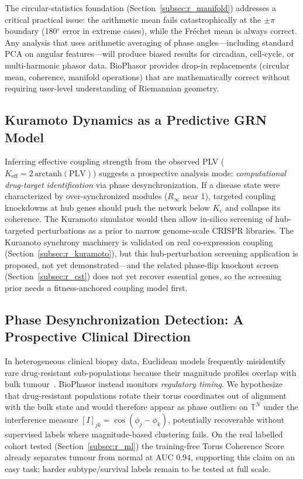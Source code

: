 \documentclass[preprint,12pt,amsmath,amssymb,superscriptaddress,floatfix]{revtex4-2}
\newcommand{\torus}{\mathbb{T}}
\begin{document}
The circular-statistics foundation (Section~\ref{subsec:r_manifold})
addresses a critical practical issue: the arithmetic mean fails
catastrophically at the $\pm\pi$ boundary (180$^\circ$ error in extreme
cases), while the Fr\'{e}chet mean is always correct.
Any analysis that uses arithmetic averaging of phase angles---including
standard PCA on angular features---will produce biased results for
circadian, cell-cycle, or multi-harmonic phasor data.
BioPhasor provides drop-in replacements (circular mean, coherence,
manifold operations) that are
mathematically correct without requiring user-level understanding
of Riemannian geometry.

\subsection{Kuramoto Dynamics as a Predictive GRN Model}

Inferring effective coupling strength from the observed PLV
($K_{\mathrm{eff}} = 2\,\mathrm{arctanh}(\mathrm{PLV})$) suggests a
prospective analysis mode: \emph{computational drug-target identification}
via phase desynchronization. If a disease state were characterized by
over-synchronized modules ($R_\infty$ near 1), targeted coupling knockdowns
at hub genes should push the network below $K_c$ and collapse its coherence.
The Kuramoto simulator would then allow in-silico screening of hub-targeted
perturbations as a prior to narrow genome-scale CRISPR libraries. The Kuramoto
synchrony machinery is validated on real co-expression coupling
(Section~\ref{subsec:r_kuramoto}), but this hub-perturbation screening
application is proposed, not yet demonstrated---and the related phase-flip
knockout screen (Section~\ref{subsec:r_cst}) does not yet recover essential
genes, so the screening prior needs a fitness-anchored coupling model first.

\subsection{Phase Desynchronization Detection: A Prospective Clinical Direction}

In heterogeneous clinical biopsy data, Euclidean models frequently
misidentify rare drug-resistant sub-populations because their magnitude
profiles overlap with bulk tumour~\cite{ref_121,ref_122,ref_123,ref_124,ref_125}.
BioPhasor instead monitors \emph{regulatory timing}. We hypothesize that
drug-resistant populations rotate their torus coordinates out of alignment
with the bulk state and would therefore appear as phase outliers on
$\torus^N$ under the interference measure $[I]_{jk} = \cos(\phi_j - \phi_k)$,
potentially recoverable without supervised labels where magnitude-based
clustering fails. On the real labelled cohort tested
(Section~\ref{subsec:r_ml}) the training-free Torus Coherence Score already
separates tumour from normal at AUC $0.94$, supporting this claim on an easy
task; harder subtype/survival labels remain to be tested at full scale.
\end{document}
